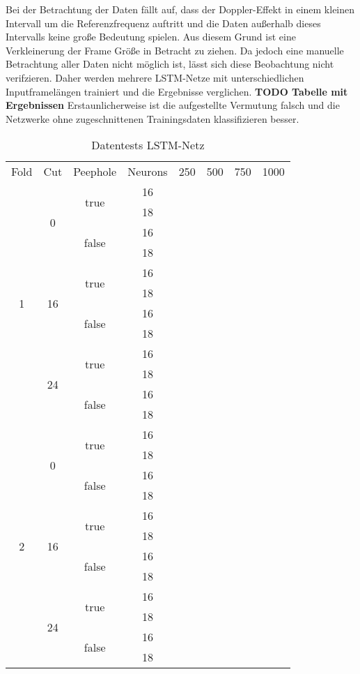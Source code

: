 Bei der Betrachtung der Daten fällt auf, dass der Doppler-Effekt in einem
kleinen Intervall um die Referenzfrequenz auftritt und die Daten außerhalb
dieses Intervalls keine große Bedeutung spielen. Aus diesem Grund ist eine
Verkleinerung der Frame Größe in Betracht zu ziehen. Da jedoch eine manuelle
Betrachtung aller Daten nicht möglich ist, lässt sich diese Beobachtung nicht
verifzieren. Daher werden mehrere \ac{LSTM}-Netze mit unterschiedlichen
Inputframelängen trainiert und die Ergebnisse verglichen. \textbf{TODO Tabelle
mit Ergebnissen} Erstaunlicherweise ist die aufgestellte Vermutung falsch und die
Netzwerke ohne zugeschnittenen Trainingsdaten klassifizieren besser. 
\begin{table*}
\centering
\begin{tabular}{|c|c|c|c|c|c|c|c|}
\hline
 Fold 		& Cut & Peephole & Neurons & 250 & 500 & 750 & 1000 \\
 \multirow{12}{*}{1}&\multirow{4}{*}{0}&\multirow{2}{*}{true}&16&	&	&	&	\\
  & & &18&	&	&	&	\\
  & &\multirow{2}{*}{false}&16&	&	&	&	\\
  & & &18&	&	&	&	\\
  &\multirow{4}{*}{16}&\multirow{2}{*}{true}&16&	&	&	&	\\
  & & &18&	&	&	&	\\
  & &\multirow{2}{*}{false}&16&	&	&	&	\\
  & & &18&	&	&	&	\\
  &\multirow{4}{*}{24}&\multirow{2}{*}{true}&16&	&	&	&	\\
  & & &18&	&	&	&	\\
  & &\multirow{2}{*}{false}&16&	&	&	&	\\
  & & &18&	&	&	&	\\
  \multirow{12}{*}{2}&\multirow{4}{*}{0}&\multirow{2}{*}{true}&16&	&	&	&	\\
  & & &18&	&	&	&	\\
  & &\multirow{2}{*}{false}&16&	&	&	&	\\
  & & &18&	&	&	&	\\
  &\multirow{4}{*}{16}&\multirow{2}{*}{true}&16&	&	&	&	\\
  & & &18&	&	&	&	\\
  & &\multirow{2}{*}{false}&16&	&	&	&	\\
  & & &18&	&	&	&	\\
  &\multirow{4}{*}{24}&\multirow{2}{*}{true}&16&	&	&	&	\\
  & & &18&	&	&	&	\\
  & &\multirow{2}{*}{false}&16&	&	&	&	\\
  & & &18&	&	&	&	\\
\hline
\end{tabular}
\caption{Datentests LSTM-Netz}
\label{tab:inputtests}
\end{table*}
